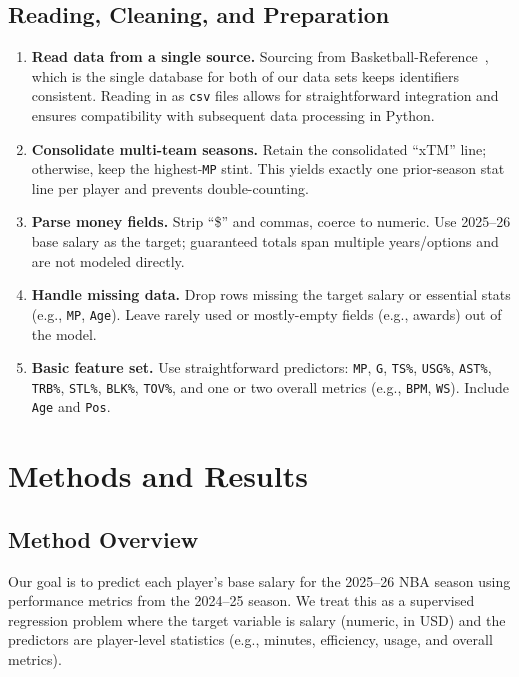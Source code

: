 \documentclass{article}
\theoremstyle{plain}
\theoremstyle{definition}
\theoremstyle{remark}
\begin{document}
\subsection*{Reading, Cleaning, and Preparation}
\begin{enumerate}
    \item  \textbf{Read data from a single source.} Sourcing from Basketball-Reference~\cite{bbref_contracts,bbref_advanced_stats_2025}, which is the single database for both of our data sets keeps identifiers consistent. Reading in as \texttt{csv} files allows for straightforward integration and ensures compatibility with subsequent data processing in Python. 
    \item \textbf{Consolidate multi-team seasons.} Retain the consolidated ``xTM'' line; otherwise, keep the highest-\texttt{MP} stint. This yields exactly one prior-season stat line per player and prevents double-counting.
    \item \textbf{Parse money fields.} Strip ``\$'' and commas, coerce to numeric. Use 2025--26 base salary as the target; guaranteed totals span multiple years/options and are not modeled directly.
    \item \textbf{Handle missing data.} Drop rows missing the target salary or essential stats (e.g., \texttt{MP}, \texttt{Age}). Leave rarely used or mostly-empty fields (e.g., awards) out of the model.
    \item \textbf{Basic feature set.} Use straightforward predictors: \texttt{MP}, \texttt{G}, \texttt{TS\%}, \texttt{USG\%}, \texttt{AST\%}, \texttt{TRB\%}, \texttt{STL\%}, \texttt{BLK\%}, \texttt{TOV\%}, and one or two overall metrics (e.g., \texttt{BPM}, \texttt{WS}). Include \texttt{Age} and \texttt{Pos}. 

\end{enumerate}

\section{Methods and Results}
\label{sec:Methods and Results}

\subsection*{Method Overview}
Our goal is to predict each player’s base salary for the 2025--26 NBA season using performance metrics from the 2024--25 season. 
We treat this as a supervised regression problem where the target variable is salary (numeric, in USD) and the predictors are player-level statistics (e.g., minutes, efficiency, usage, and overall metrics).
\end{document}

